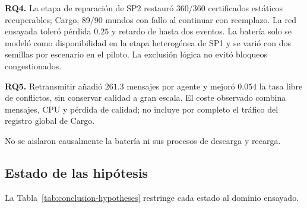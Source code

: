 \textbf{RQ4.} La etapa de reparación de SP2 restauró 360/360 certificados estáticos recuperables; Cargo,
89/90 mundos con fallo al continuar con reemplazo. La red ensayada toleró
pérdida $0.25$ y retardo de hasta dos eventos. La batería solo se modeló como
disponibilidad en la etapa heterogénea de SP1 y se varió con dos semillas por escenario en el piloto.
La exclusión lógica no evitó bloqueos congestionados.

\textbf{RQ5.} Retransmitir añadió $261.3$ mensajes por agente y mejoró $0.054$
la tasa libre de conflictos, sin conservar calidad a gran escala. El coste
observado combina mensajes, CPU y pérdida de calidad; no incluye por completo
el tráfico del registro global de Cargo.

No se aislaron causalmente la batería ni sus procesos de descarga y recarga.

\subsection{Estado de las hipótesis}

La Tabla~\ref{tab:conclusion-hypotheses} restringe cada estado al dominio ensayado.

